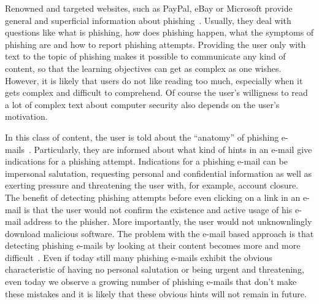 \begin{description}[leftmargin=0cm]
	\item[General Knowledge Transfer] Renowned and targeted websites, such as PayPal, eBay or Microsoft provide general and superficial information about phishing~\cite{generalknowledgemicrosoft, generalknowledgepaypal, generalknowledgeebay}.
	Usually, they deal with questions like what is phishing, how does phishing happen, what the symptoms of phishing are and how to report phishing attempts.
 Providing the user only with text to the topic of phishing makes it possible to communicate any kind of content, so that the learning objectives can get as complex as one wishes.
 However, it is likely that users do not like reading too much, especially when it gets complex and difficult to comprehend.
 Of course the user's willigness to read a lot of complex text about computer security also depends on the user's motivation. 
	\item[E-Mail Based Knowledge] In this class of content, the user is told about the ``anatomy'' of phishing e-mails~\cite{antiphishingphyllis, sonicwall}. Particularly, they are informed about what kind of hints in an e-mail give indications for a phishing attempt.
 Indications for a phishing e-mail can be impersonal salutation, requesting personal and confidential information as well as exerting pressure and threatening the user with, for example, account closure.
 The benefit of detecting phishing attempts before even clicking on a link in an e-mail is that the user would not confirm the existence and active usage of his e-mail address to the phisher.
 More importantly, the user would not unknownlingly download malicious software.
 The problem with the e-mail based approach is that detecting phishing e-mails by looking at their content becomes more and more difficult~\cite{microsoftphishing,spamfighter}. Even if today still many phishing e-mails exhibit the obvious characteristic of having no personal salutation or being urgent and threatening, even today we observe a growing number of phishing e-mails that don't make these mistakes and it is likely that these obvious hints will not remain in future.


\end{description}
